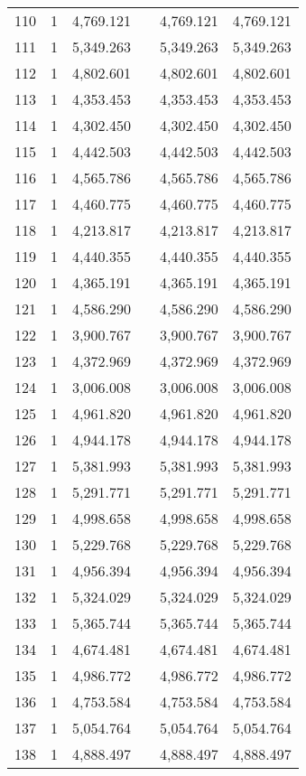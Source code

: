 \begin{table}[!htbp]
\begin{tabular}{@{\extracolsep{5pt}}lccccc}
110 & 1 & 4,769.121 &  & 4,769.121 & 4,769.121 \\ 
111 & 1 & 5,349.263 &  & 5,349.263 & 5,349.263 \\ 
112 & 1 & 4,802.601 &  & 4,802.601 & 4,802.601 \\ 
113 & 1 & 4,353.453 &  & 4,353.453 & 4,353.453 \\ 
114 & 1 & 4,302.450 &  & 4,302.450 & 4,302.450 \\ 
115 & 1 & 4,442.503 &  & 4,442.503 & 4,442.503 \\ 
116 & 1 & 4,565.786 &  & 4,565.786 & 4,565.786 \\ 
117 & 1 & 4,460.775 &  & 4,460.775 & 4,460.775 \\ 
118 & 1 & 4,213.817 &  & 4,213.817 & 4,213.817 \\ 
119 & 1 & 4,440.355 &  & 4,440.355 & 4,440.355 \\ 
120 & 1 & 4,365.191 &  & 4,365.191 & 4,365.191 \\ 
121 & 1 & 4,586.290 &  & 4,586.290 & 4,586.290 \\ 
122 & 1 & 3,900.767 &  & 3,900.767 & 3,900.767 \\ 
123 & 1 & 4,372.969 &  & 4,372.969 & 4,372.969 \\ 
124 & 1 & 3,006.008 &  & 3,006.008 & 3,006.008 \\ 
125 & 1 & 4,961.820 &  & 4,961.820 & 4,961.820 \\ 
126 & 1 & 4,944.178 &  & 4,944.178 & 4,944.178 \\ 
127 & 1 & 5,381.993 &  & 5,381.993 & 5,381.993 \\ 
128 & 1 & 5,291.771 &  & 5,291.771 & 5,291.771 \\ 
129 & 1 & 4,998.658 &  & 4,998.658 & 4,998.658 \\ 
130 & 1 & 5,229.768 &  & 5,229.768 & 5,229.768 \\ 
131 & 1 & 4,956.394 &  & 4,956.394 & 4,956.394 \\ 
132 & 1 & 5,324.029 &  & 5,324.029 & 5,324.029 \\ 
133 & 1 & 5,365.744 &  & 5,365.744 & 5,365.744 \\ 
134 & 1 & 4,674.481 &  & 4,674.481 & 4,674.481 \\ 
135 & 1 & 4,986.772 &  & 4,986.772 & 4,986.772 \\ 
136 & 1 & 4,753.584 &  & 4,753.584 & 4,753.584 \\ 
137 & 1 & 5,054.764 &  & 5,054.764 & 5,054.764 \\ 
138 & 1 & 4,888.497 &  & 4,888.497 & 4,888.497 \\ 

\end{tabular}
\end{table}
